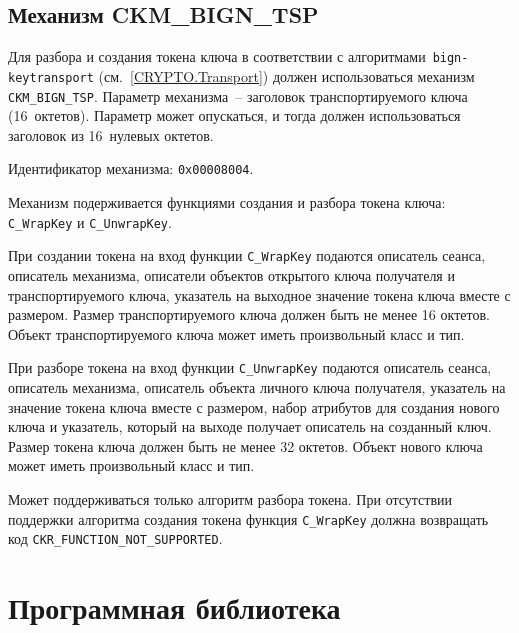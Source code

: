 \subsection{Механизм CKM\_BIGN\_TSP}\label{CRYPTOKI.Transport}


Для разбора и создания токена ключа в соответствии с 
алгоритмами~\texttt{bign-keytransport} (см.~\ref{CRYPTO.Transport}) должен 
использоваться механизм \verb|CKM_BIGN_TSP|.
%
Параметр механизма~-- заголовок транспортируемого ключа (16~октетов). 
Параметр может опускаться, и тогда должен использоваться
заголовок из 16~нулевых октетов.

Идентификатор механизма: \texttt{0x00008004}.

Механизм подерживается функциями создания и разбора токена ключа:
\verb|C_WrapKey| и \verb|C_UnwrapKey|.

При создании токена на вход функции \verb|C_WrapKey| подаются
описатель сеанса, описатель механизма, описатели объектов открытого ключа
получателя и транспортируемого ключа, указатель на
выходное значение токена ключа вместе с размером.
Размер транспортируемого ключа должен быть не менее 16 октетов.
Объект транспортируемого ключа может иметь произвольный класс и тип.

При разборе токена на вход функции \verb|C_UnwrapKey| подаются
описатель сеанса, описатель механизма, описатель объекта личного ключа
получателя, указатель на значение токена ключа вместе с размером,
набор атрибутов для создания нового ключа и указатель,
который на выходе получает описатель на созданный ключ.
Размер токена ключа должен быть не менее 32 октетов.
Объект нового ключа может иметь произвольный класс и тип.

Может поддерживаться только алгоритм разбора токена.
При отсутствии поддержки алгоритма создания токена
функция \verb|C_WrapKey| должна возвращать код 
\verb|CKR_FUNCTION_NOT_SUPPORTED|.

\section{Программная библиотека}\label{CRYPTOKI.Lib}

